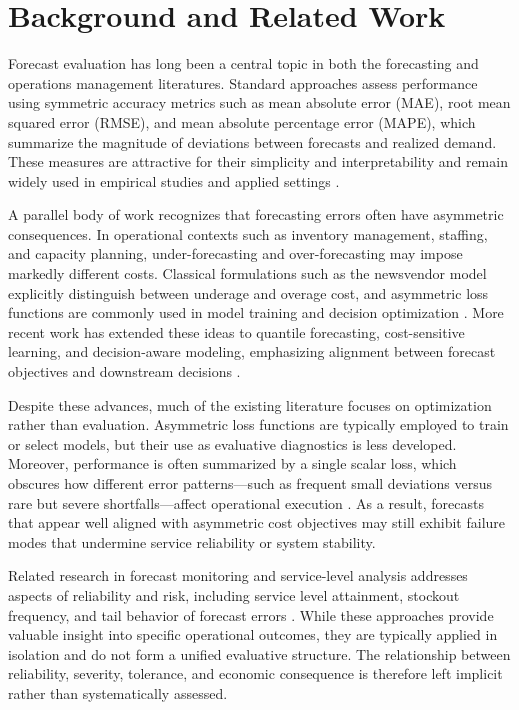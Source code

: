\section{Background and Related Work}

Forecast evaluation has long been a central topic in both the forecasting and operations
management literatures. Standard approaches assess performance using symmetric accuracy
metrics such as mean absolute error (MAE), root mean squared error (RMSE), and mean absolute
percentage error (MAPE), which summarize the magnitude of deviations between forecasts and
realized demand. These measures are attractive for their simplicity and interpretability and remain
widely used in empirical studies and applied settings
\citep{hyndman2018forecasting,makridakis2020forecasting}.

A parallel body of work recognizes that forecasting errors often have asymmetric consequences.
In operational contexts such as inventory management, staffing, and capacity planning,
under-forecasting and over-forecasting may impose markedly different costs. Classical formulations
such as the newsvendor model explicitly distinguish between underage and overage cost, and
asymmetric loss functions are commonly used in model training and decision optimization
\citep{arrow1951optimal,petruzzi1999newsvendor}. More recent work has extended these ideas to
quantile forecasting, cost-sensitive learning, and decision-aware modeling, emphasizing alignment
between forecast objectives and downstream decisions
\citep{koenker2005quantile,bengio2020decision}.

Despite these advances, much of the existing literature focuses on optimization rather than
evaluation. Asymmetric loss functions are typically employed to train or select models, but their
use as evaluative diagnostics is less developed. Moreover, performance is often summarized by a
single scalar loss, which obscures how different error patterns—such as frequent small deviations
versus rare but severe shortfalls—affect operational execution
\citep{christoffersen2018evaluating}. As a result, forecasts that appear well aligned with asymmetric
cost objectives may still exhibit failure modes that undermine service reliability or system stability.

Related research in forecast monitoring and service-level analysis addresses aspects of reliability
and risk, including service level attainment, stockout frequency, and tail behavior of forecast
errors \citep{silver1998inventory,nahmias2009production}. While these approaches provide valuable
insight into specific operational outcomes, they are typically applied in isolation and do not form a
unified evaluative structure. The relationship between reliability, severity, tolerance, and economic
consequence is therefore left implicit rather than systematically assessed.

